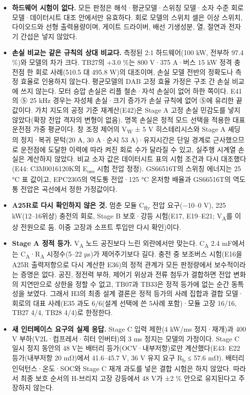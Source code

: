 \begin{itemize}
\item \textbf{하드웨어 시험이 없다.} 모든 판정은 해석·평균모델·스위칭 모델·소자 수준 회로 모델·데이터시트 대조 안에서만 유효하다. 회로 모델의 스위치 셀은 이상 스위치, 다이오드와 선형 출력용량이며, 게이트 드라이버, 배선 기생성분, 열, 절연과 전자기 간섭은 넣지 않았다.
\item \textbf{손실 비교는 같은 규칙의 상대 비교다.} 측정된 2:1 하드웨어(100 kW, 전부하 97.4 \%)와 모델의 차가 크다. TB27의 +3.0 \%는 800 V·375 A·버스 15 kW 정격 충전점 한 회로 사례(510.5 대 495.8 W)의 대조이며, 손실 모델 전반의 정확도나 측정 효율로 인용하지 않는다. 평균모델의 DAB 고정 효율 가정은 구조 간 손실 비교에 쓰지 않는다. 모터 승압 손실은 리플 철손·자석 손실이 없어 하한 쪽이다. E41의 ⑤ 25 kHz 경우는 자성체 손실·크기 증가가 손실 규칙에 없어 ⑤에 유리한 끝값이다. 가치 지도의 공정 기준 재계산(E42)은 Stage A 고정 손실 민감도를 넣지 않았다(확장 전압 격자의 변형이 없음). 명목 손실은 정적 모드 선택을 적용한 대표 운전점 가중 평균이다. 창 조정 제어의 V\textsubscript{W} ± 5 V 히스테리시스와 Stage A 셰딩의 정지·복귀 문턱(20 A, 30 A·순시 53 A)·유지시간은 단일 경계로 근사했으므로 운전점에 도달한 이력에 따라 켜진 회로 수가 달라질 수 있고, 실주행 시계열 손실은 계산하지 않았다. 비교 소자 값은 데이터시트 표의 시험 조건과 다시 대조했다(E44: C3M0016120K의 E\textsubscript{oss} 시험 전압 정정). GS66516T의 스위칭 에너지는 25 °C 표 값이고, EPC2305의 역도통 전압·125 °C 온저항 배율과 GS66516T의 역도통 전압은 곡선에서 정한 가정값이다.
\item \textbf{A25R로 다시 확인하지 않은 것.} 멈춘 모듈 C\textsubscript{fly} 전압 요구(−10–0 V), 225 kW(12–16위상) 충전의 회로, Stage B 보호·강등 시험(E17, E19–E21; V\textsubscript{A}를 이상 전원으로 둠. 이중 고장과 소프트 투입만 다시 확인)이다.
\item \textbf{Stage A 정적 등가.} V\textsubscript{A} 노드 공진보다 느린 외란에서만 맞는다. C\textsubscript{A} 2.4 mF에서는 C\textsubscript{A}·R\textsubscript{A} 시정수(5–22 µs)가 제어주기보다 길다. 충전 중 보조버스 시험(E16을 A25R 출력저항으로 다시 계산한 E36)의 정적 관계가 모든 판정량에서 보수적이라는 증명은 없다. 공진, 정전력 부하, 제어기 위상과 전류 첨두가 결합하면 전압 변화의 지연만으로 상한을 정할 수 없고, TB07과 TB33은 정적 등가에 없는 순간 동특성을 보였다. 그래서 H3의 최종 설계 결론은 정적 등가의 사례 집합과 결합 모델·회로의 대표 사례(E35 과도 6/6(설계 선택에 쓴 5사례 포함)·모듈 고장 16/16, TB27 4/4, TB28 4/4)로 한정한다.
\item \textbf{새 인터페이스 요구의 실제 응답.} Stage C 입력 제한(4 kW/ms 정지·재개)과 400 V 부하(V2L·컴프레서·히터 인버터)의 3 ms 정지는 모델의 가정이다. Stage C 일시 정지 동안의 48 V는 배터리 등가(OCV·내부저항)로만 계산했다(E43: E22 등가(내부저항 20 mΩ)에서 41.6–45.7 V, 36 V 유지 요구 R\textsubscript{b} ≤ 57.6 mΩ). 배터리 인덕턴스·온도·SOC와 Stage C 재개 과도를 넣은 결합 시험은 하지 않았다. 따라서 최종 보호 순서의 H-브리지 고장 강등에서 48 V가 ±2 \% 안으로 유지된다고 주장하지 않는다.

\end{itemize}
